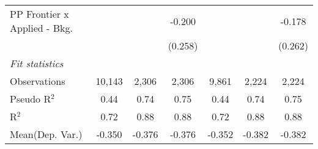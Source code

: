 \begin{tabular}{lcccccc}
   PP Frontier x Applied - Bkg.   &                &              & -0.200        &                &              & -0.178\\   
                                  &                &              & (0.258)       &                &              & (0.262)\\   
   \midrule
   \emph{Fit statistics}\\
   Observations                   & 10,143         & 2,306        & 2,306         & 9,861          & 2,224        & 2,224\\  
   Pseudo R$^2$                   & 0.44           & 0.74         & 0.75          & 0.44           & 0.74         & 0.75\\  
   R$^2$                          & 0.72           & 0.88         & 0.88          & 0.72           & 0.88         & 0.88\\  
Mean(Dep. Var.) & -0.350 & -0.376 & -0.376 & -0.352 & -0.382 & -0.382 \\
   

\end{tabular}
